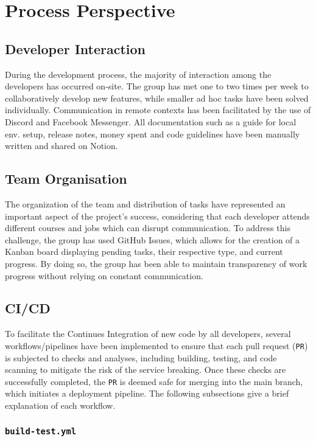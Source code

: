 \chapter{Process Perspective}

\section{Developer Interaction}

During the development process, the majority of interaction among the developers has occurred on-site. The group has met one to two times per week to collaboratively develop new features, while smaller ad hoc tasks have been solved individually. Communication in remote contexts has been facilitated by the use of Discord and Facebook Messenger. All documentation such as a guide for local env. setup, release notes, money spent and code guidelines have been manually written and shared on Notion. 

\section{Team Organisation}

The organization of the team and distribution of tasks have represented an important aspect of the project's success, considering that each developer attends different courses and jobs which can disrupt communication. To address this challenge, the group has used GitHub Issues, which allows for the creation of a Kanban board displaying pending tasks, their respective type, and current progress. By doing so, the group has been able to maintain transparency of work progress without relying on constant communication.

\section{CI/CD}
\label{sec:ci-cd}

To facilitate the Continues Integration of new code by all developers, several workflows/pipelines have been implemented to ensure that each pull request (\texttt{PR}) is subjected to checks and analyses, including building, testing, and code scanning to mitigate the risk of the service breaking. Once these checks are successfully completed, the \texttt{PR} is deemed safe for merging into the main branch, which initiates a deployment pipeline. The following subsections give a brief explanation of each workflow. 

\subsection{\texttt{build-test.yml}}

